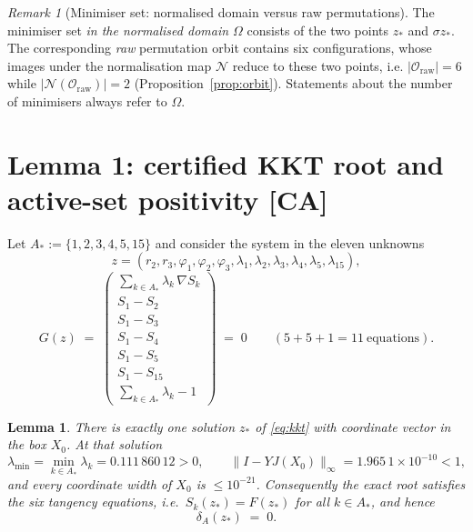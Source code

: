 \documentclass[11pt]{article}
\newtheorem{lemma}[theorem]{Lemma}
\theoremstyle{remark}
\newtheorem{remark}[theorem]{Remark}
\newcommand{\CA}{\textsf{[CA]}}
\newcommand{\Om}{\Omega}
\begin{document}
\begin{remark}[Minimiser set: normalised domain versus raw permutations]\label{rem:frozen}
The minimiser set \emph{in the normalised domain $\Om$} consists of the two points $z_*$ and $\sigma z_*$.
The corresponding \emph{raw} permutation orbit contains six configurations, whose images under the
normalisation map $\mathcal N$ reduce to these two points, i.e.
$|\mathcal O_{\mathrm{raw}}|=6$ while $|\mathcal N(\mathcal O_{\mathrm{raw}})|=2$
(Proposition~\ref{prop:orbit}). Statements about the number of minimisers always refer to $\Om$.
\end{remark}

\section{Lemma 1: certified KKT root and active-set positivity \CA}\label{lem:kkt}

Let $A_*:=\{1,2,3,4,5,15\}$ and consider the system in the eleven unknowns
\[
z=(r_2,r_3,\varphi_1,\varphi_2,\varphi_3,\lambda_1,\lambda_2,\lambda_3,\lambda_4,\lambda_5,\lambda_{15}),
\]
\begin{equation}\label{eq:kkt}
G(z)\;=\;
\begin{pmatrix}
\sum_{k\in A_*}\lambda_k\,\nabla S_k \\[2pt]
S_1-S_2 \\ S_1-S_3 \\ S_1-S_4 \\ S_1-S_5 \\ S_1-S_{15} \\[2pt]
\sum_{k\in A_*}\lambda_k-1
\end{pmatrix}
\;=\;0
\qquad(5+5+1=11\ \text{equations}).
\end{equation}

\begin{lemma}\label{lem:kkt}
There is exactly one solution $z_*$ of \eqref{eq:kkt} with coordinate vector in the box $X_0$.
At that solution
\[
\lambda_{\min}=\min_{k\in A_*}\lambda_k = 0.111\,860\,12 >0,
\qquad
\|I-YJ(X_0)\|_\infty = 1.965\,1\times10^{-10} < 1,
\]
and every coordinate width of $X_0$ is $\le 10^{-21}$. Consequently the exact root satisfies the six
tangency equations, i.e.\ $S_k(z_*)=F(z_*)$ for all $k\in A_*$, and hence
\begin{equation}\label{eq:deltaA0}
\delta_A(z_*)\;=\;0 .
\end{equation}
\end{lemma}
\end{document}
